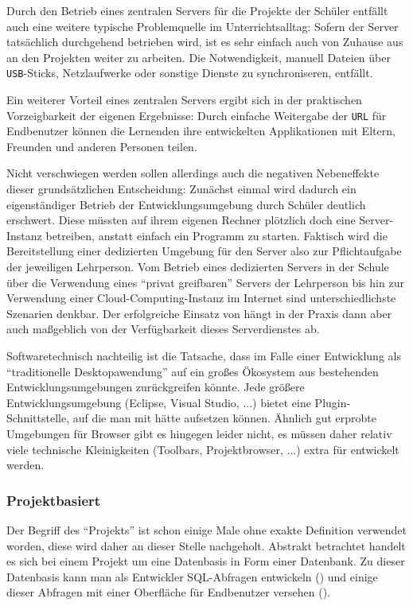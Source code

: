 Durch den Betrieb eines zentralen Servers für die Projekte der Schüler entfällt auch eine weitere typische Problemquelle im Unterrichtsalltag: Sofern der Server tatsächlich durchgehend betrieben wird, ist es sehr einfach auch von Zuhause aus an den Projekten weiter zu arbeiten. Die Notwendigkeit, manuell Dateien über \texttt{USB}-Sticks, Netzlaufwerke oder sonstige Dienste zu synchroniseren, entfällt.

Ein weiterer Vorteil eines zentralen Servers ergibt sich in der praktischen Vorzeigbarkeit der eigenen Ergebnisse: Durch einfache Weitergabe der \texttt{URL} für Endbenutzer können die Lernenden ihre entwickelten Applikationen mit Eltern, Freunden und anderen Personen teilen.

Nicht verschwiegen werden sollen allerdings auch die negativen Nebeneffekte dieser grundsätzlichen Entscheidung: Zunächst einmal wird dadurch ein eigenständiger Betrieb der Entwicklungsumgebung durch Schüler deutlich erschwert. Diese müssten auf ihrem eigenen Rechner plötzlich doch eine Server-Instanz betreiben, anstatt einfach ein Programm zu starten. Faktisch wird die Bereitstellung einer dedizierten Umgebung für den Server also zur Pflichtaufgabe der jeweiligen Lehrperson. Vom Betrieb eines dedizierten Servers in der Schule über die Verwendung eines "`privat greifbaren"' Servers der Lehrperson bis hin zur Verwendung einer Cloud-Computing-Instanz im Internet sind unterschiedlichste Szenarien denkbar. Der erfolgreiche Einsatz von \idename{} hängt in der Praxis dann aber auch maßgeblich von der Verfügbarkeit dieses Serverdienstes ab.

Softwaretechnisch nachteilig ist die Tatsache, dass \idename{} im Falle einer Entwicklung als "`traditionelle Desktopawendung"' auf ein großes Ökosystem aus bestehenden Entwicklungsumgebungen zurückgreifen könnte. Jede größere Entwicklungsumgebung (Eclipse, Visual Studio, ...) bietet eine Plugin-Schnittstelle, auf die man mit \idename{} hätte aufsetzen können. Ähnlich gut erprobte Umgebungen für Browser gibt es hingegen leider nicht, es müssen daher relativ viele technische Kleinigkeiten (Toolbars, Projektbrowser, ...) extra für \idename{} entwickelt werden.

\subsubsection{Projektbasiert}

Der Begriff des "`Projekts"' ist schon einige Male ohne exakte Definition verwendet worden, diese wird daher an dieser Stelle nachgeholt. Abstrakt betrachtet handelt es sich bei einem Projekt um eine Datenbasis in Form einer Datenbank. Zu dieser Datenbasis kann man als Entwickler SQL-Abfragen entwickeln () und einige dieser Abfragen mit einer Oberfläche für Endbenutzer versehen ().

